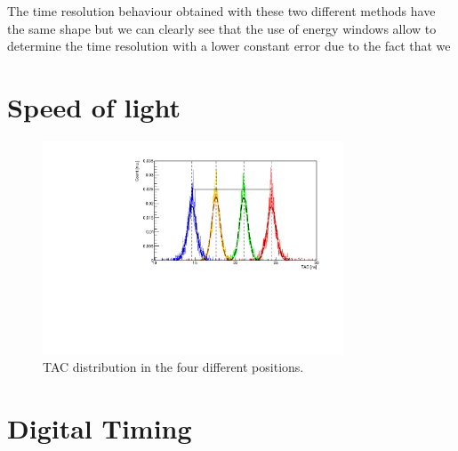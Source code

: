 \documentclass[a4paper,11pt]{article}
\begin{document}
\noindent The time resolution behaviour obtained with these two different methods have the same shape but we can clearly see that the use of energy windows allow to determine the time resolution with a lower constant error due to the fact that we 

\section*{Speed of light}
\lipsum[1]
\begin{figure}[h!]
\centering
\includegraphics[width=0.8\textwidth]{TACoverlayed_dist}
\caption{TAC distribution in the four different positions.}
\end{figure}

\section*{Digital Timing}
\lipsum[1]
\end{document}
